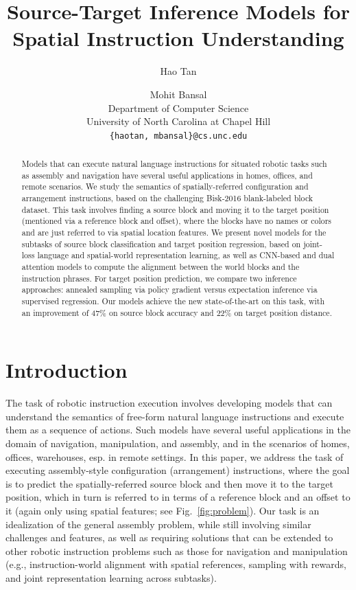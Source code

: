 \documentclass[letterpaper]{article} %
\title{Source-Target Inference Models for Spatial Instruction Understanding}
\author{Hao Tan \and Mohit Bansal\\
Department of Computer Science\\
University of North Carolina at Chapel Hill\\
\texttt{\{haotan, mbansal\}@cs.unc.edu}\\
}
\date{}
\begin{document}
\maketitle

\begin{abstract}
Models that can execute natural language instructions for situated robotic tasks such as assembly and navigation have several useful applications in homes, offices, and remote scenarios.
We study the semantics of spatially-referred configuration and arrangement instructions, based on the challenging Bisk-2016 blank-labeled block dataset. This task involves finding a source block and moving it to the target position (mentioned via a reference block and offset), where the blocks have no names or colors and are just referred to via spatial location features.
We present novel models for the subtasks of source block classification and target position regression, based on joint-loss language and spatial-world representation learning, as well as CNN-based and dual attention models to compute the alignment between the world blocks and the instruction phrases. For target position prediction, we compare two inference approaches: annealed sampling via policy gradient versus expectation inference via supervised regression. Our models achieve the new state-of-the-art on this task, with an improvement of 47\% on source block accuracy and 22\% on target position distance. 

\end{abstract}


\section{Introduction}

The task of robotic instruction execution involves developing models that can understand the semantics of free-form natural language instructions and execute them as a sequence of actions. Such models have several useful applications in the domain of navigation, manipulation, and assembly, and in the scenarios of homes, offices, warehouses, esp. in remote settings. In this paper, we address the task of executing assembly-style configuration (arrangement) instructions, where the goal is to predict the spatially-referred source block and then move it to the target position, which in turn is referred to in terms of a reference block and an offset to it (again only using spatial features; see Fig.~\ref{fig:problem}). 
Our task is an idealization of the general assembly problem, while still involving similar challenges and features, as well as requiring solutions that can be extended to other robotic instruction problems such as those for navigation and manipulation (e.g., instruction-world alignment with spatial references, sampling with rewards, and joint representation learning across subtasks).
\end{document}
